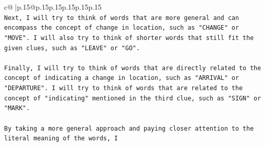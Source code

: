 \documentclass{article}
\begin{document}
{\begin{supertabular}{c@{$\;$}|p{.15\linewidth}@{}p{.15\linewidth}p{.15\linewidth}p{.15\linewidth}p{.15\linewidth}p{.15\linewidth}}
{{{\\ 
\texttt{Next, I will try to think of words that are more general and can encompass the concept of change in location, such as "CHANGE" or "MOVE". I will also try to think of shorter words that still fit the given clues, such as "LEAVE" or "GO".} \\
\\ 
\texttt{Finally, I will try to think of words that are directly related to the concept of indicating a change in location, such as "ARRIVAL" or "DEPARTURE". I will try to think of words that are related to the concept of "indicating" mentioned in the third clue, such as "SIGN" or "MARK".} \\
\\ 
\texttt{By taking a more general approach and paying closer attention to the literal meaning of the words, I} \\
            }
        }
    }
     \\ \\

\end{supertabular}
}
\end{document}
